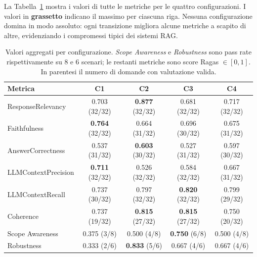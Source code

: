 \documentclass[11pt,a4paper]{article}
\begin{document}
La Tabella~\ref{tab:allresults} mostra i valori di tutte le metriche per le quattro
configurazioni. I valori in \textbf{grassetto} indicano il massimo per ciascuna riga.
Nessuna configurazione domina in modo assoluto: ogni transizione migliora alcune
metriche a scapito di altre, evidenziando i compromessi tipici dei sistemi RAG.

\begin{table}[H]
\centering
\caption{Valori aggregati per configurazione. \textit{Scope Awareness} e
         \textit{Robustness} sono pass rate rispettivamente su 8 e 6 scenari;
         le restanti metriche sono score Ragas $\in[0,1]$. In parentesi il numero
         di domande con valutazione valida.}
\label{tab:allresults}
\small
\begin{tabular}{@{}lcccc@{}}
\toprule
\textbf{Metrica} & \textbf{C1} & \textbf{C2} & \textbf{C3} & \textbf{C4} \\
\midrule
\rowcolor{blue!4}
ResponseRelevancy   & 0.703 \scriptsize(32/32) & \textbf{0.877} \scriptsize(32/32)
                    & 0.681 \scriptsize(32/32) & 0.717 \scriptsize(32/32) \\
Faithfulness        & \textbf{0.764} \scriptsize(32/32) & 0.664 \scriptsize(31/32)
                    & 0.696 \scriptsize(30/32) & 0.675 \scriptsize(31/32) \\
\rowcolor{blue!4}
AnswerCorrectness   & 0.537 \scriptsize(31/32) & \textbf{0.603} \scriptsize(30/32)
                    & 0.527 \scriptsize(31/32) & 0.597 \scriptsize(30/32) \\
LLMContextPrecision & \textbf{0.711} \scriptsize(32/32) & 0.526 \scriptsize(32/32)
                    & 0.584 \scriptsize(32/32) & 0.667 \scriptsize(31/32) \\
\rowcolor{blue!4}
LLMContextRecall    & 0.737 \scriptsize(30/32) & 0.797 \scriptsize(32/32)
                    & \textbf{0.820} \scriptsize(32/32) & 0.799 \scriptsize(29/32) \\
Coherence           & 0.737 \scriptsize(19/32) & \textbf{0.815} \scriptsize(27/32)
                    & \textbf{0.815} \scriptsize(27/32) & 0.750 \scriptsize(20/32) \\
\rowcolor{blue!4}
Scope Awareness     & 0.375 \scriptsize(3/8)  & 0.500 \scriptsize(4/8)
                    & \textbf{0.750} \scriptsize(6/8)  & 0.500 \scriptsize(4/8) \\
Robustness          & 0.333 \scriptsize(2/6)  & \textbf{0.833} \scriptsize(5/6)
                    & 0.667 \scriptsize(4/6)  & 0.667 \scriptsize(4/6) \\
\bottomrule
\end{tabular}
\end{table}
\end{document}
